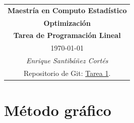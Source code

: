 \documentclass[11pt,letterpaper]{article}
\begin{document}
\begin{table}[ht]
\centering
\begin{tabular}{c}
\textbf{Maestría en Computo Estadístico}\\
\textbf{Optimización} \\
\textbf{Tarea de Programación Lineal}\\
\today \\
\emph{Enrique Santibáñez Cortés}\\
Repositorio de Git: \href{https://https://github.com/Enriquesec/Optimizacion/tree/master/tareas/tarea_1}{Tarea 1}.
\end{tabular}
\end{table}

\section{Método gráfico}
\end{document}
